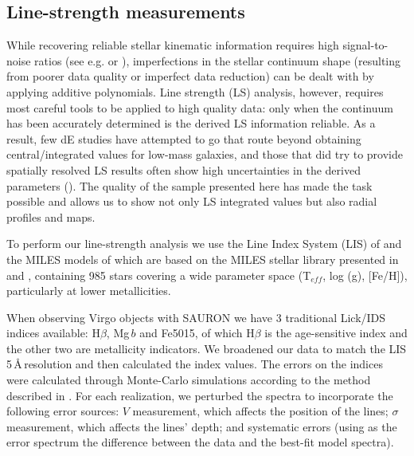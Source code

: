 \documentclass[useAMS,usenatbib]{mn2e}
\newcommand{\hb}{H$\beta$}
\newcommand{\sig}{$\sigma$}
\newcommand{\mgb}{Mg\,$b$}
\begin{document}
\subsection{Line-strength measurements}
\label{ls-mes}

While recovering reliable stellar kinematic information requires high signal-to-noise ratios (see e.g. \citealt{toloba:2009} or \citealt{rys:2013}), imperfections in the stellar continuum shape (resulting from poorer data quality or imperfect data reduction) can be dealt with by applying additive polynomials. Line strength (LS) analysis, however, requires most careful tools to be applied to high quality data: only when the continuum has been accurately determined is the derived LS information reliable. As a result, few dE studies have attempted to go that route beyond obtaining central/integrated values for low-mass galaxies, and those that did try to provide spatially resolved LS results often show high uncertainties in the derived parameters (\citealt{michielsen:2008}). The quality of the sample presented here has made the task possible and allows us to show not only LS integrated values but also radial profiles and maps. 

To perform our line-strength analysis we use the Line Index System (LIS) of \cite{vazdekis:2010} and the MILES models of \citealt{vazdekis:2015} which are based on the MILES stellar library presented in \cite{sanchez-blazquez:2006} and \cite{falcon:2011a}, containing 985 stars covering a wide parameter space (T$_{eff}$, log (g), [Fe/H]), particularly at lower metallicities.

When observing Virgo objects with SAURON we have 3 traditional Lick/IDS indices available: \hb, {\mgb} and Fe5015, of which {\hb} is the  age-sensitive index and the other two are metallicity indicators. We broadened our data to match the LIS 5\,\AA\,resolution and then calculated the index values. The errors on the indices were calculated through Monte-Carlo simulations according to the method described in \cite{rys:2013}. For each realization, we perturbed the spectra to incorporate the following error sources: $V$ measurement, which affects the position of the lines; {\sig} measurement, which affects the lines' depth; and systematic errors (using as the error spectrum the difference between the data and the best-fit model spectra).
\end{document}
